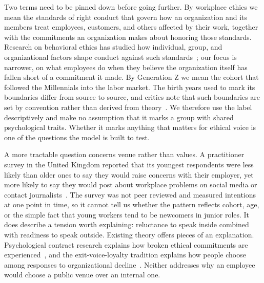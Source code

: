 Two terms need to be pinned down before going further. By workplace ethics we mean the standards of right conduct that govern how an organization and its members treat employees, customers, and others affected by their work, together with the commitments an organization makes about honoring those standards. Research on behavioral ethics has studied how individual, group, and organizational factors shape conduct against such standards~\citep{trevino2006behavioral}; our focus is narrower, on what employees do when they believe the organization itself has fallen short of a commitment it made. By Generation Z we mean the cohort that followed the Millennials into the labor market. The birth years used to mark its boundaries differ from source to source, and critics note that such boundaries are set by convention rather than derived from theory~\citep{rudolph2021generations}. We therefore use the label descriptively and make no assumption that it marks a group with shared psychological traits. Whether it marks anything that matters for ethical voice is one of the questions the model is built to test.

A more tractable question concerns venue rather than values. A practitioner survey in the United Kingdom reported that its youngest respondents were less likely than older ones to say they would raise concerns with their employer, yet more likely to say they would post about workplace problems on social media or contact journalists~\citep{protect2025talkin}. The survey was not peer reviewed and measured intentions at one point in time, so it cannot tell us whether the pattern reflects cohort, age, or the simple fact that young workers tend to be newcomers in junior roles. It does describe a tension worth explaining: reluctance to speak inside combined with readiness to speak outside. Existing theory offers pieces of an explanation. Psychological contract research explains how broken ethical commitments are experienced~\citep{thompson2003violations}, and the exit-voice-loyalty tradition explains how people choose among responses to organizational decline~\citep{hirschman1970exit,turnley1999impact}. Neither addresses why an employee would choose a public venue over an internal one.

